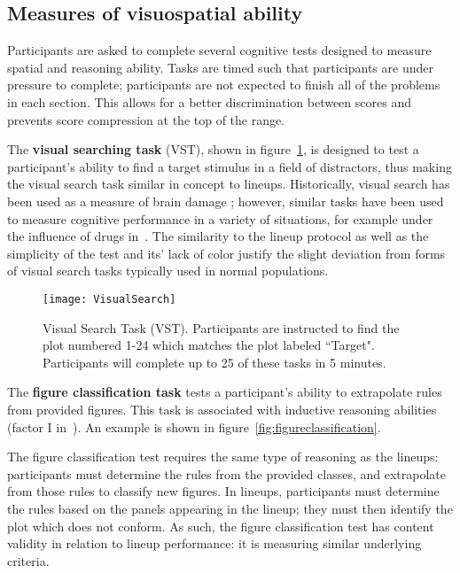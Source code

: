 \documentclass[journal]{vgtc}\usepackage[]{graphicx}\usepackage[]{color}
\begin{document}
\subsection{Measures of visuospatial ability}

Participants are asked to complete several cognitive tests designed to measure spatial and reasoning ability. Tasks are timed such  that participants are under  pressure to complete; participants are not expected to finish all of the problems in each section. This allows for a better discrimination between scores and prevents score compression at the top of the range. 

The \textbf{visual searching task} (VST), shown in figure~\ref{fig:VST}, is designed to test a participant's ability to find a target stimulus in a field of distractors, thus making the visual search task similar in concept to lineups. Historically, visual search has been used as a measure of brain damage \cite{goldstein1973validity,demita1981validity,moerland1986neuropsychological}; however, similar tasks have been used to measure cognitive performance in a variety of situations, for example under the influence of drugs in~\cite{anderson1983interactive}. The similarity to the lineup protocol as well as the simplicity of the test and its' lack of color justify the slight deviation from forms of visual search tasks typically used in normal populations. 

\begin{figure}[htp]\centering
\texttt{[image: VisualSearch]}
\caption[Visual Search Task]{Visual Search Task (VST). Participants are instructed to find the plot numbered 1-24 which matches the plot labeled ``Target". Participants will complete up to 25 of these tasks in 5 minutes.}\label{fig:VST}
\end{figure}

The \textbf{figure classification task} tests a participant's ability to extrapolate rules from provided figures. This task is associated with inductive reasoning abilities (factor I  in~\cite{ekstrom1976manual}). An example is shown in figure~\ref{fig:figureclassification}. 

The figure classification test requires the same type of reasoning as the lineups: participants must determine the rules from the provided classes, and extrapolate from those rules to classify new figures. In lineups, participants must determine the rules based on the panels appearing in the lineup; they must then identify the plot which does not conform. As such, the figure classification test has content validity in relation to lineup performance: it is measuring similar underlying criteria. 
\end{document}
